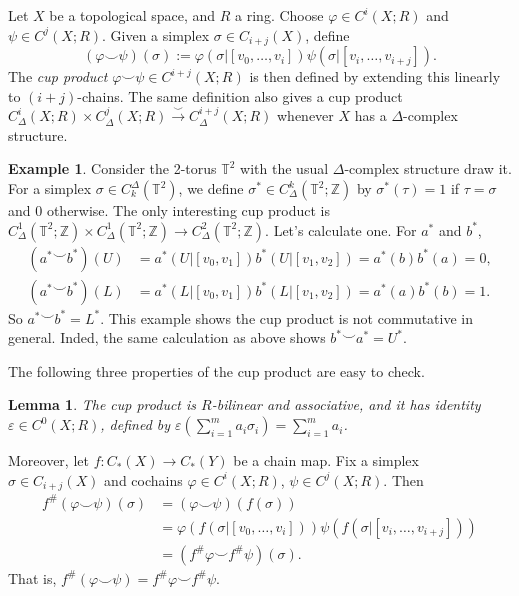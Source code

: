 \documentclass{book}
\newcommand{\bbT}{\mathbb{T}}
\newcommand{\bbZ}{\mathbb{Z}}
\renewcommand{\epsilon}{\varepsilon}
\renewcommand{\phi}{\varphi}
\newcommand{\parens}[1]{\left( {#1} \right)}
\newtheorem{lemma}[theorem]{Lemma}
\theoremstyle{definition}
\newtheorem{example}[theorem]{Example}
\theoremstyle{remark}
\numberwithin{equation}{section}
\begin{document}
Let $X$ be a topological space, and $R$ a ring. Choose $\phi \in C^i(X;R)$ and $\psi \in C^j(X;R)$. Given a simplex $\sigma \in C_{i+j}(X)$, define 
\begin{equation}
    (\phi \smile \psi)(\sigma) := \phi(\sigma \vert [v_0,\dots,v_i]) \psi(\sigma \vert [v_i,\dots,v_{i+j}]).
\end{equation}
The \textit{cup product} $\phi \smile \psi \in C^{i+j}(X;R)$ is then defined by extending this linearly to $(i+j)$-chains. The same definition also gives a cup product $C_\Delta^i(X;R) \times C_\Delta^j(X;R) \overset{\smile}{\to} C_\Delta^{i+j}(X;R)$ whenever $X$ has a $\Delta$-complex structure.
\begin{example}
    Consider the 2-torus $\bbT^2$ with the usual $\Delta$-complex structure {\color{red} draw it}. For a simplex $\sigma \in C_k^\Delta(\bbT^2)$, we define $\sigma^* \in C^k_\Delta(\bbT^2;\bbZ)$ by $\sigma^*(\tau) = 1$ if $\tau = \sigma$ and $0$ otherwise. The only interesting cup product is $C^1_\Delta(\bbT^2;\bbZ) \times C^1_\Delta(\bbT^2;\bbZ) \to C^2_\Delta(\bbT^2;\bbZ)$. Let's calculate one. For $a^*$ and $b^*$,
    \begin{equation} \begin{aligned}
        (a^* \smile b^*)(U) &= a^*(U \vert [v_0,v_1]) b^*(U \vert [v_1,v_2]) = a^*(b) b^*(a) = 0, \\
        (a^* \smile b^*)(L) &= a^*(L \vert [v_0,v_1]) b^*(L \vert [v_1,v_2]) = a^*(a) b^*(b) = 1.
    \end{aligned} \end{equation}
    So $a^* \smile b^* = L^*$. This example shows the cup product is not commutative in general. Inded, the same calculation as above shows $b^* \smile a^* = U^*$.
\end{example}

The following three properties of the cup product are easy to check.
\begin{lemma}
    The cup product is $R$-bilinear and associative, and it has identity $\epsilon \in C^0(X;R)$, defined by $\epsilon\parens{ \sum_{i=1}^m a_i \sigma_i } = \sum_{i=1}^m a_i$.
\end{lemma}
Moreover, let $f \colon C_*(X) \to C_*(Y)$ be a chain map. Fix a simplex $\sigma \in C_{i+j}(X)$ and cochains $\phi \in C^i(X;R)$, $\psi \in C^j(X;R)$. Then 
\begin{equation} \begin{aligned}
    f^\#(\phi \smile \psi)(\sigma) &= (\phi \smile \psi)(f(\sigma)) \\
                                   &= \phi(f(\sigma \vert [v_0,\dots,v_i])) \psi(f(\sigma \vert [v_i,\dots,v_{i+j}])) \\
                                   &= (f^\# \phi \smile f^\# \psi)(\sigma).
\end{aligned} \end{equation}
That is, $f^\#(\phi \smile \psi) = f^\# \phi \smile f^\# \psi$.
\end{document}
